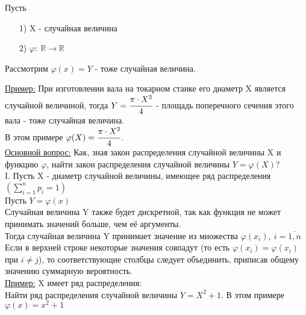 
Пусть 
\begin{enumerate}
\item[1)] X - случайная величина
\item[2)] $\varphi: \ \mathbb{R} \to \mathbb{R}$ 
\end{enumerate}
Рассмотрим $\varphi(x) = Y$ - тоже случайная величина.


\underline{Пример:} При изготовлении вала на токарном станке его диаметр X является случайной величиной, тогда $Y = \cfrac{\pi \cdot X^2}{4}$ - площадь поперечного сечения этого вала - тоже случайная величина.\\
В этом примере $\varphi(X) = \cfrac{\pi \cdot X^2}{4}$. \\


\underline{Основной вопрос:} Как, зная закон распределения случайной величины X и функцию $\varphi$, найти закон распределения случайной величины $Y = \varphi(X)$? \\

I. Пусть X - диаметр случайной величины, имеющее ряд распределения \\
$\left( \sum\limits_{i = 1}^{n} p_i = 1 \right)$ \\
Пусть $Y = \varphi(x)$ \\
Случайная величина Y также будет дискретной, так как функция не может принимать значений больше, чем её аргументы. \\
Тогда случайная величина Y принимает значение из множества $\varphi(x_i), \ i = \overline{1,n}$ \\
Если в верхней строке некоторые значения совпадут (то есть $\varphi(x_i) = \varphi(x_i)$ при $i \neq j$), то соответствующие столбцы следует объединить, приписав общему значению суммарную вероятность. \\


\underline{Пример:} X имеет ряд распределения: \\
% 
Найти ряд распределения случайной величины $Y = X^2 + 1$. В этом примере $\varphi(x) = x^2 + 1$ \\





























